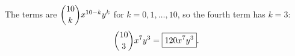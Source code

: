 The terms are $\dbinom{10}{k}x^{10-k}y^k$ for $k=0,1,\dots,10$, so the fourth term has $k=3$:
\[\dbinom{10}{3}x^7y^3=\boxed{120x^7y^3}.\]
